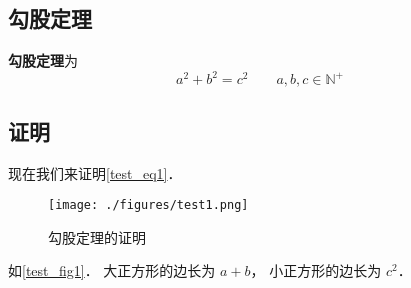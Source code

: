 

\subsection{勾股定理}
\textbf{勾股定理}为
\begin{equation}\label{test_eq1}
a^2 + b^2 = c^2 \qquad a,b,c \in \mathbb{N}^+
\end{equation}

\subsection{证明}
现在我们来证明\autoref{test_eq1}．

\begin{figure}[ht]
\centering
\texttt{[image: ./figures/test1.png]}
\caption{勾股定理的证明} \label{test_fig1}
\end{figure}

如\autoref{test_fig1}． 大正方形的边长为 $a + b$， 小正方形的边长为 $c^2$． 
